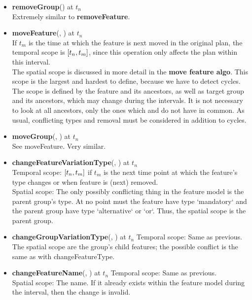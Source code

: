 \begin{itemize}
  \item \textbf{removeGroup}() at $t_n$\\
    Extremely similar to \textbf{removeFeature}. 
  \item \textbf{moveFeature}(, ) at $t_n$\\
  If $t_m$ is the time at which the feature is next moved in the original plan, the temporal scope is $\interval{t_n}{t_m}$, since this operation only affects the plan within this interval.\\
  The spatial scope is discussed in more detail in the \textbf{move feature algo}. This scope is the largest and hardest to define, because we have to detect cycles. The scope is defined by the feature and its ancestors, as well as target group and its ancestors, which may change during the intervals. It is not necessary to look at all ancestors, only the ones which  and  do not have in common. As usual, conflicting types and removal must be considered in addition to cycles.
  \item \textbf{moveGroup}(, ) at $t_n$\\
    See moveFeature. Very similar.
  \item \textbf{changeFeatureVariationType}(, ) at $t_n$\\
    Temporal scope: $\interval{t_n}{t_m}$ if $t_m$ is the next time point at which the feature's type changes or when feature is (next) removed.\\
    Spatial scope: The only possibly conflicting thing in the feature model is the parent group's type. At no point must the feature have type `mandatory` and the parent group have type `alternative` or `or`. Thus, the spatial scope is the parent group.\\
  \item \textbf{changeGroupVariationType}(, ) at $t_n$
    Temporal scope: Same as previous.\\
    The spatial scope are the group's child features; the possible conflict is the same as with changeFeatureType.\\
  \item \textbf{changeFeatureName}(, ) at $t_n$
    Temporal scope: Same as previous.\\
    Spatial scope: The name. If it already exists within the feature model during the interval, then the change is invalid. 
\end{itemize}

